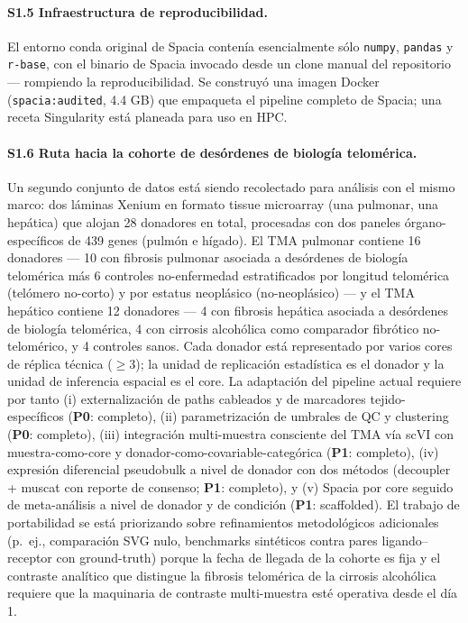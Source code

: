 \documentclass[12pt,a4paper]{article}
\begin{document}
\paragraph{S1.5 Infraestructura de reproducibilidad.}
El entorno conda original de Spacia contenía esencialmente sólo \texttt{numpy}, \texttt{pandas} y \texttt{r-base}, con el binario de Spacia invocado desde un clone manual del repositorio --- rompiendo la reproducibilidad. Se construyó una imagen Docker (\texttt{spacia:audited}, 4.4 GB) que empaqueta el pipeline completo de Spacia; una receta Singularity está planeada para uso en HPC.

\paragraph{S1.6 Ruta hacia la cohorte de desórdenes de biología telomérica.}
Un segundo conjunto de datos está siendo recolectado para análisis con el mismo marco: dos láminas Xenium en formato tissue microarray (una pulmonar, una hepática) que alojan 28 donadores en total, procesadas con dos paneles órgano-específicos de 439 genes (pulmón e hígado). El TMA pulmonar contiene 16 donadores --- 10 con fibrosis pulmonar asociada a desórdenes de biología telomérica más 6 controles no-enfermedad estratificados por longitud telomérica (telómero no-corto) y por estatus neoplásico (no-neoplásico) --- y el TMA hepático contiene 12 donadores --- 4 con fibrosis hepática asociada a desórdenes de biología telomérica, 4 con cirrosis alcohólica como comparador fibrótico no-telomérico, y 4 controles sanos. Cada donador está representado por varios cores de réplica técnica ($\geq 3$); la unidad de replicación estadística es el donador y la unidad de inferencia espacial es el core. La adaptación del pipeline actual requiere por tanto (i) externalización de paths cableados y de marcadores tejido-específicos (\textbf{P0}: completo), (ii) parametrización de umbrales de QC y clustering (\textbf{P0}: completo), (iii) integración multi-muestra consciente del TMA vía scVI con muestra-como-core y donador-como-covariable-categórica (\textbf{P1}: completo), (iv) expresión diferencial pseudobulk a nivel de donador con dos métodos (decoupler + muscat con reporte de consenso; \textbf{P1}: completo), y (v) Spacia por core seguido de meta-análisis a nivel de donador y de condición (\textbf{P1}: scaffolded). El trabajo de portabilidad se está priorizando sobre refinamientos metodológicos adicionales (p.\ ej., comparación SVG nulo, benchmarks sintéticos contra pares ligando--receptor con ground-truth) porque la fecha de llegada de la cohorte es fija y el contraste analítico que distingue la fibrosis telomérica de la cirrosis alcohólica requiere que la maquinaria de contraste multi-muestra esté operativa desde el día 1.
\end{document}

